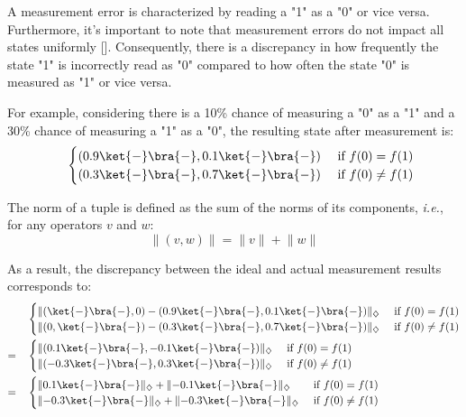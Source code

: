 A measurement error is characterized by reading a "1" as a "0" or vice versa. Furthermore, it's important to note that measurement errors do not impact all states uniformly [\cite{tannu2019mitigating}]. Consequently, there is a discrepancy in how frequently the state "1" is incorrectly read as "0" compared to how often the state "0" is measured as "1" or vice versa.

For example, considering there is a 10\% chance of measuring a "0" as a "1" and a 30\% chance of measuring a "1" as a "0", the resulting state after measurement is:
\begin{equation}
\begin{split}
  \quad &
  \begin{cases}
   (0.9\ket{-} \bra{-},0.1\ket{-} \bra{-})  &\text{ if }   f(0)= f(1) \\
   (0.3\ket{-} \bra{-}, 0.7\ket{-} \bra{-}) &\text{ if }   f(0) \neq f(1) 
  \end{cases} \\
\end {split}
\end{equation}

The norm of a tuple is defined as the sum of the norms of its components, \textit{i.e.}, for any operators $v$ and $w$:
\begin{equation} \label{eq:norm_tuple}
  \lVert (v,w) \rVert = \lVert v \rVert + \lVert w \rVert
\end{equation}

As a result, the discrepancy between the ideal and actual measurement results corresponds to:
\begin{equation}
  \begin{split}
    \quad &
    \begin{cases}
      \lVert(\ket{-} \bra{-},0) - (0.9\ket{-} \bra{-},0.1\ket{-} \bra{-})   \rVert_{\diamondsuit} &\text{ if }   f(0)= f(1) \\
      \lVert (0,\ket{-} \bra{-}) - (0.3\ket{-} \bra{-}, 0.7\ket{-} \bra{-}) \rVert_{\diamondsuit} &\text{ if }   f(0) \neq f(1) 
    \end{cases} \\
    = \quad &
    \begin{cases}
      \lVert(0.1\ket{-} \bra{-},-0.1\ket{-} \bra{-})   \rVert_{\diamondsuit} &\text{ if }   f(0)= f(1) \\
      \lVert (-0.3\ket{-} \bra{-}, 0.3\ket{-} \bra{-}) \rVert_{\diamondsuit} &\text{ if }   f(0) \neq f(1)
    \end{cases} \\
    = \quad &
    \begin{cases}
      \lVert 0.1\ket{-} \bra{-}\rVert_{\diamondsuit} + \lVert - 0.1 \ket{-} \bra{-}\rVert_{\diamondsuit} &\text{ if }   f(0)= f(1) \\
      \lVert -0.3\ket{-} \bra{-}\rVert_{\diamondsuit} + \lVert - 0.3 \ket{-} \bra{-}\rVert_{\diamondsuit} &\text{ if }   f(0) \neq f(1)
    \end{cases} \\
  \end {split}
  \end{equation}

